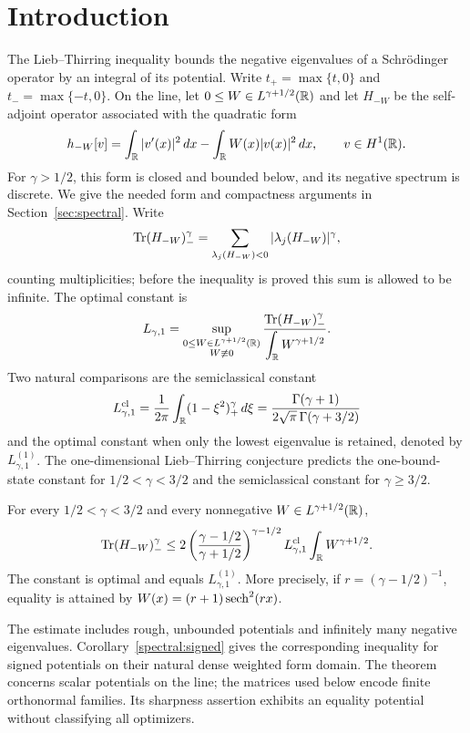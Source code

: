 \section{Introduction}\label{sec:intro}

The Lieb--Thirring inequality bounds the negative eigenvalues of a
Schr\"odinger operator by an integral of its potential. Write
$t_+=\max\{t,0\}$ and $t_-=\max\{-t,0\}$. On the line, let
$0\le W\in L^{\gamma+1/2}(\mathbb R)$ and let $H_{-W}$ be the self-adjoint operator
associated with the quadratic form
\[
 h_{-W}[v]=\int_\mathbb R|v'(x)|^2\,dx-\int_\mathbb R W(x)|v(x)|^2\,dx,
 \qquad v\in H^1(\mathbb R).
\]
For $\gamma>1/2$, this form is closed and bounded below, and its negative
spectrum is discrete. We give the needed form and compactness arguments in
Section~\ref{sec:spectral}. Write
\[
 \operatorname{Tr}(H_{-W})_-^\gamma
   =\sum_{\lambda_j(H_{-W})<0}|\lambda_j(H_{-W})|^\gamma,
\]
counting multiplicities; before the inequality is proved this sum is allowed
to be infinite. The optimal constant is
\[
 L_{\gamma,1}=
 \sup_{\substack{0\le W\in L^{\gamma+1/2}(\mathbb R)\\W\not\equiv0}}
 \frac{\operatorname{Tr}(H_{-W})_-^\gamma}{\displaystyle\int_\mathbb R W^{\gamma+1/2}}.
\]
Two natural comparisons are the semiclassical constant
\begin{equation}\label{eq:semiclassical}
 L_{\gamma,1}^{\mathrm{cl}}
 =\frac1{2\pi}\int_\mathbb R(1-\xi^2)_+^\gamma\,d\xi
 =\frac{\Gamma(\gamma+1)}{2\sqrt\pi\,\Gamma(\gamma+3/2)}
\end{equation}
and the optimal constant when only the lowest eigenvalue is retained,
denoted by $L_{\gamma,1}^{(1)}$. The one-dimensional Lieb--Thirring
conjecture predicts the one-bound-state constant for
$1/2<\gamma<3/2$ and the semiclassical constant for $\gamma\ge3/2$.

\begin{theorem}\label{thm:main}
For every $1/2<\gamma<3/2$ and every nonnegative
$W\in L^{\gamma+1/2}(\mathbb R)$,
\begin{equation}\label{eq:main}
 \operatorname{Tr}(H_{-W})_-^\gamma
 \le 2\left(\frac{\gamma-1/2}{\gamma+1/2}\right)^{\gamma-1/2}
       L_{\gamma,1}^{\mathrm{cl}}\int_\mathbb R W^{\gamma+1/2}.
\end{equation}
The constant is optimal and equals $L_{\gamma,1}^{(1)}$.
More precisely, if $r=(\gamma-1/2)^{-1}$, equality is attained by
$W(x)=(r+1)\operatorname{sech}^2(rx)$.
\end{theorem}

The estimate includes rough, unbounded potentials and infinitely many
negative eigenvalues. Corollary~\ref{spectral:signed} gives the corresponding
inequality for signed potentials on their natural dense weighted form
domain. The theorem concerns scalar potentials on the line; the matrices
used below encode finite orthonormal families. Its sharpness assertion
exhibits an equality potential without classifying all optimizers.

